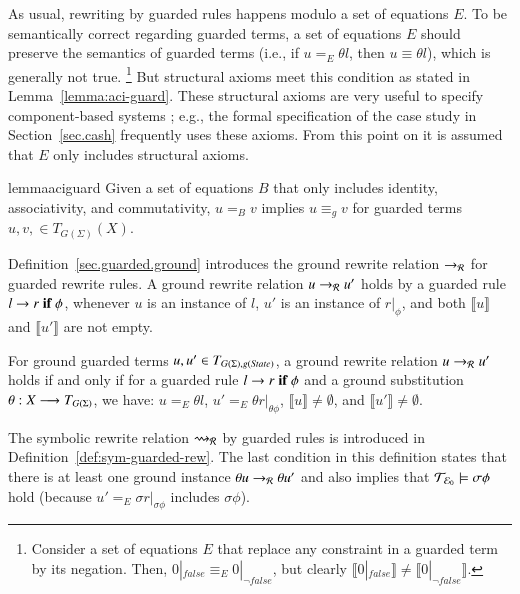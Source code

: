 As usual, rewriting by guarded rules happens modulo a set of equations
$E$.  To be semantically correct regarding guarded terms, a set of
equations $E$ should preserve the semantics of guarded terms (i.e., if
$u =_E \theta l$, then $u \equiv \theta l$), which is generally not
true.%
\footnote{Consider a set of equations $E$ that replace any constraint in a guarded term by its negation.
Then, $0 |_{\mathit{false}} \equiv_E 0 |_{\neg \mathit{false}}$,
but clearly $\llbracket 0 |_{\mathit{false}} \rrbracket \neq  \llbracket 0 |_{\neg \mathit{false}} \rrbracket$.}
But structural axioms meet this condition as stated in
Lemma~\ref{lemma:aci-guard}. 
%
These structural axioms are very useful to specify component-based systems \cite{clavel-maudebook-2007};
e.g., the formal specification of the case study in Section~\ref{sec.cash} frequently uses these axioms.
%
From this point on it is assumed that $E$
only includes structural axioms.


\begin{restatable}{lemma}{aciguard}
\label{lemma:aci-guard}
Given a set of equations $B$ that only includes identity,
associativity, and commutativity, $u =_B v$ implies $u \equiv_g v$ for
guarded terms $u, v, \in T_{G(\Sigma)}(X)$.
\end{restatable}
\noindent 


Definition~\ref{sec.guarded.ground} introduces the ground rewrite
relation $\to_{\mathcal{R}}$ for guarded rewrite rules.  A ground rewrite
relation $u \to_{\mathcal{R}} u'$ holds by a guarded rule $l \rightarrow r\;\textnormal{\bf if}\; {\phi}$,
whenever $u$ is an instance of $l$, $u'$ is an instance of $r
|_{\phi}$, and both $\llbracket u \rrbracket$ and $\llbracket u'
\rrbracket$ are not empty.

\begin{definition}\label{sec.guarded.ground}
For ground guarded terms $u, u' \in T_{G(\Sigma),g(\textit{State})}$,
a ground rewrite relation $u \to_{\mathcal{R}} u'$ holds  if and only if for a guarded rule
$l \rightarrow r\;\textnormal{\bf if}\; {\phi}$ and a ground substitution
$\theta : X \longrightarrow T_{G(\Sigma)}$,
we have: $u =_E \theta l$, $u' =_E \theta r
|_{\theta \phi}$, $\llbracket u \rrbracket \neq \emptyset$, and
$\llbracket u' \rrbracket \neq \emptyset$.
\end{definition}

The symbolic rewrite relation $\rightsquigarrow_{\mathcal{R}}$ by guarded rules %
is introduced in
Definition~\ref{def:sym-guarded-rew}.  The last condition in this
definition states that there is at least one ground instance $\theta u
\to_{\mathcal{R}} \theta u'$ and also implies that $\mathcal{T}_{\mathcal{E}_{0}} \models \sigma \phi$
hold (because $u' =_E \sigma r |_{\sigma \phi}$ includes $\sigma
\phi$).

